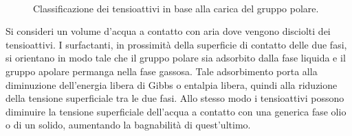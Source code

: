 \begin{figure}[htbp]
    \centering
     \quad
      \\
      \quad
\caption{Classificazione dei tensioattivi in base alla carica del gruppo polare.}
\label{fig:surfactants-classification}
\end{figure}

Si consideri un volume d'acqua a contatto con aria dove vengono disciolti dei tensioattivi. I surfactanti, in prossimità della superficie di contatto delle due fasi, si orientano in modo tale che il gruppo polare sia adsorbito dalla fase liquida e il gruppo apolare permanga nella fase gassosa. Tale adsorbimento porta alla diminuzione dell'energia libera di Gibbs o entalpia libera, quindi alla riduzione della tensione superficiale tra le due fasi. Allo stesso modo i tensioattivi possono diminuire la tensione superficiale dell'acqua a contatto con una generica fase olio o di un solido, aumentando la bagnabilità di quest'ultimo.

